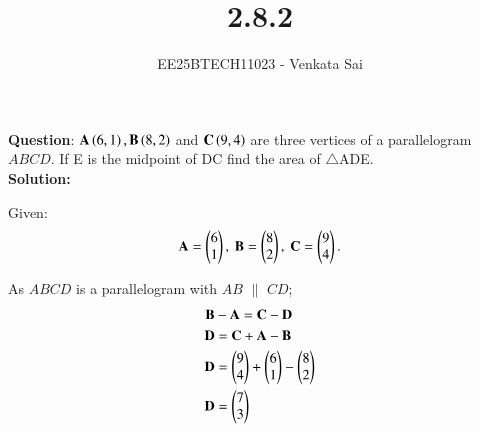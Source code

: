\documentclass[journal]{IEEEtran}
\begin{document}


\title{2.8.2}
\author{EE25BTECH11023 - Venkata Sai}
{\let\newpage\relax\maketitle}

\renewcommand{\thefigure}{\theenumi}
\renewcommand{\thetable}{\theenumi}
\setlength{\intextsep}{10pt} %


\renewcommand{\thetable}{\theenumi}

\textbf{Question}:\newline
$\mathbf{A}\left(6,1\right),\mathbf{B}\left(8, 2\right)$ and $\mathbf{C}\left(9, 4\right)$ are three vertices of a parallelogram $ABCD$. If E is the
midpoint of DC find the area of $\triangle$ADE. 
\\

\textbf{Solution:}

Given:
\begin{align}
\vec{A}=\myvec{6\\1},\ 
\vec{B}=\myvec{8\\2},\ 
\vec{C}=\myvec{9\\4}.
\end{align}

As $ABCD$ is a parallelogram with $AB$ $\parallel$ $CD$;
\begin{align}
    \mathbf{B}&-\mathbf{A}=\mathbf{C}-\mathbf{D} \\
    \mathbf{D}&=\mathbf{C}+\mathbf{A}-\mathbf{B} \\
    \mathbf{D}&=\begin{pmatrix}9\\4\end{pmatrix}+\begin{pmatrix}6\\1\end{pmatrix}-\begin{pmatrix}8\\2\end{pmatrix} \\
    \mathbf{D}&=\begin{pmatrix}7\\3\end{pmatrix}
\end{align}
\end{document}
